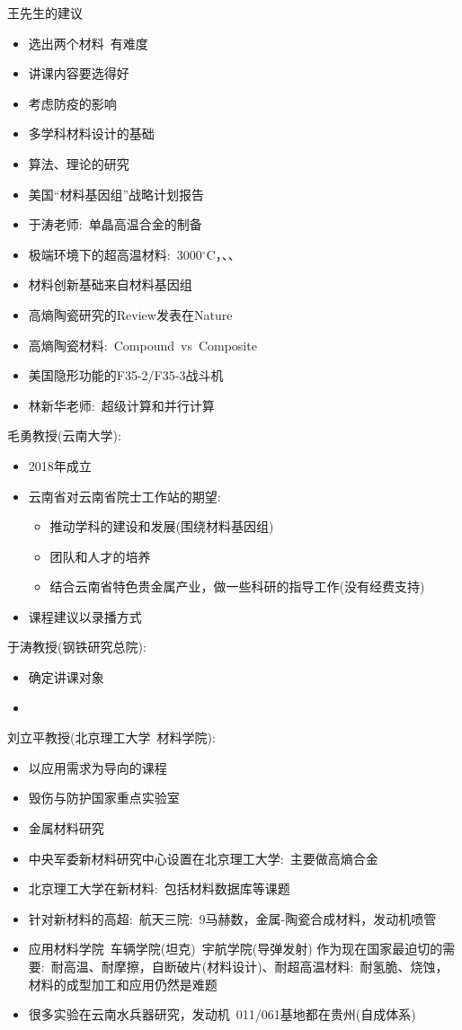 王先生的建议
\begin{itemize}
	\item 选出两个材料~有难度
	\item 讲课内容要选得好
	\item 考虑防疫的影响
	\item 多学科材料设计的基础
	\item 算法、理论的研究
	\item 美国``材料基因组''战略计划报告
	\item 于涛老师:~单晶高温合金的制备
	\item 极端环境下的超高温材料:~3000$^{\circ}\mathrm{C}$，、、
	\item 材料创新基础来自材料基因组
	\item 高熵陶瓷研究的\textrm{Review}发表在\textrm{Nature}
	\item 高熵陶瓷材料:~\textrm{Compound~vs~Composite}
	\item 美国隐形功能的\textrm{F35-2/F35-3}战斗机
	\item 林新华老师:~超级计算和并行计算
\end{itemize}

毛勇教授(云南大学):
\begin{itemize}
	\item 2018年成立
	\item 云南省对云南省院士工作站的期望:~
		\begin{itemize}
			\item 推动学科的建设和发展(围绕材料基因组)
			\item 团队和人才的培养
			\item 结合云南省特色贵金属产业，做一些科研的指导工作(没有经费支持)
		\end{itemize}
	\item 课程建议以录播方式
\end{itemize}

于涛教授(钢铁研究总院):
\begin{itemize}
	\item 确定讲课对象
	\item 
\end{itemize}

刘立平教授(北京理工大学~材料学院):
\begin{itemize}
	\item 以应用需求为导向的课程
	\item 毁伤与防护国家重点实验室
	\item 金属材料研究
	\item 中央军委新材料研究中心设置在北京理工大学:~主要做高熵合金
	\item 北京理工大学在新材料:~包括材料数据库等课题
	\item 针对新材料的高超:~航天三院:~9马赫数，金属-陶瓷合成材料，发动机喷管
	\item 应用材料学院~车辆学院(坦克)~宇航学院(导弹发射)
		作为现在国家最迫切的需要:~耐高温、耐摩擦，自断破片(材料设计)、耐超高温材料:~耐氢脆、烧蚀，
		材料的成型加工和应用仍然是难题
	\item 很多实验在云南水兵器研究，发动机~011/061基地都在贵州(自成体系)
\end{itemize}
